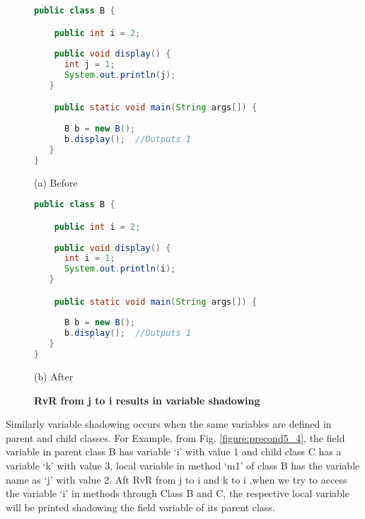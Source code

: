 \begin{figure}[th]
\centering
\begin{minipage}[t]{0.8\linewidth}
\begin{lstlisting}[language=java, basicstyle=\scriptsize\ttfamily,frame=single]
public class B {

    public int i = 2;
    
    public void display() {
      int j = 1;
      System.out.println(j); 		
   }

    public static void main(String args[]) {
    
      B b = new B();
      b.display();	//Outputs 1
   }
}
\end{lstlisting}
\centering(a) Before 
\end{minipage}
\hfill
\begin{minipage}[t]{0.8\linewidth}
\begin{lstlisting}[language=java, basicstyle=\scriptsize\ttfamily,frame=single]
public class B {

    public int i = 2;
    
    public void display() {
      int i = 1;
      System.out.println(i); 		
   }

    public static void main(String args[]) {
    
      B b = new B();
      b.display();	//Outputs 1
   }
}
\end{lstlisting}
\centering(b) After 
\end{minipage}
\caption{\textbf{RvR from j to i results in variable shadowing}}
\label{figure:precond5_3}
\end{figure}

Similarly variable shadowing occurs when the same variables are defined in parent and child classes.
For Example, from Fig. \ref{figure:precond5_4}, the field variable  in parent class B has variable `i' with value 1 and child class C has a variable `k' with value 3, local variable in method `m1' of class B has the  variable name as `j' with value 2.  Aft RvR from j to i and k to i ,when we try to access the variable `i' in methods through Class B and C, the respective local variable will be printed shadowing the field variable of its parent class.


